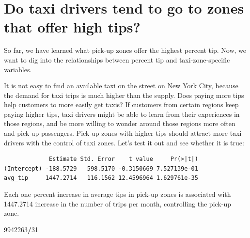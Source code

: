 \documentclass[12pt,twoside]{reedthesis}
\newenvironment{Shaded}{\begin{snugshade}}{\end{snugshade}}
\newcommand{\KeywordTok}[1]{\textcolor[rgb]{0.13,0.29,0.53}{\textbf{#1}}}
\newcommand{\DataTypeTok}[1]{\textcolor[rgb]{0.13,0.29,0.53}{#1}}
\newcommand{\DecValTok}[1]{\textcolor[rgb]{0.00,0.00,0.81}{#1}}
\newcommand{\StringTok}[1]{\textcolor[rgb]{0.31,0.60,0.02}{#1}}
\newcommand{\CommentTok}[1]{\textcolor[rgb]{0.56,0.35,0.01}{\textit{#1}}}
\newcommand{\OperatorTok}[1]{\textcolor[rgb]{0.81,0.36,0.00}{\textbf{#1}}}
\newcommand{\NormalTok}[1]{#1}
\theoremstyle{definition}
\theoremstyle{definition}
\theoremstyle{definition}
\theoremstyle{remark}
\begin{document}
\section{Do taxi drivers tend to go to zones that offer high
tips?}\label{do-taxi-drivers-tend-to-go-to-zones-that-offer-high-tips}

So far, we have learned what pick-up zones offer the highest percent
tip. Now, we want to dig into the relationships between percent tip and
taxi-zone-specific variables.

It is not easy to find an available taxi on the street on New York City,
because the demand for taxi trips is much higher than the supply. Does
paying more tips help customers to more easily get taxis? If customers
from certain regions keep paying higher tips, taxi drivers might be able
to learn from their experiences in those regions, and be more willing to
wonder around those regions more often and pick up passengers. Pick-up
zones with higher tips should attract more taxi drivers with the control
of taxi zones. Let's test it out and see whether it is true:
\begin{Shaded}
\end{Shaded}
\begin{verbatim}
             Estimate Std. Error    t value     Pr(>|t|)
(Intercept) -188.5729   598.5170 -0.3150669 7.527139e-01
avg_tip     1447.2714   116.1562 12.4596964 1.629761e-35
\end{verbatim}
Each one percent increase in average tips in pick-up zones is associated
with 1447.2714 increase in the number of trips per month, controlling
the pick-up zone.
\begin{Shaded}
\begin{Highlighting}[]
\DecValTok{9942263}\OperatorTok{/}\DecValTok{31}
\end{Highlighting}
\end{Shaded}
\end{document}
